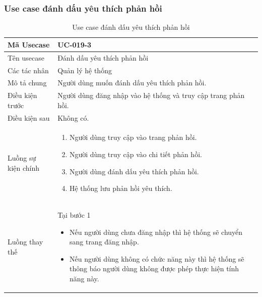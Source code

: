 \documentclass[12pt,a4paper]{article}
\begin{document}
    \subsubsection*{Use case đánh dấu yêu thích phản hồi}
    \begin{table}[H]
        \centering
        \begin{tabular}{|p{3.5cm}|p{11.5cm}|c|}
            \hline
            Mã Usecase      & UC-019-3                                                      \\
            \hline
            Tên usecase     & Đánh dấu yêu thích phản hồi                                   \\
            \hline
            Các tác nhân    & Quản lý hệ thống                                              \\
            \hline
            Mô tả chung     & Người dùng muốn đánh dấu yêu thích phản hồi.                  \\
            \hline

            Điều kiện trước & Người dùng đăng nhập vào hệ thống và truy cập trang phản hồi. \\
            \hline

            Điều kiện sau   & Không có.                                                     \\
            \hline

            Luồng sự kiện chính & \vspace{-.8cm}\begin{enumerate}
                                                    \item Người dùng truy cập vào trang phản hồi.
                                                    \item Người dùng truy cập vào chi tiết phản hồi.
                                                    \item Người dùng đánh dấu yêu thích phản hồi.
                                                    \item Hệ thống lưu phản hồi yêu thích.
            \end{enumerate}
            \\
            \hline
            Luồng thay thế & Tại bước 1\newline
            \vspace{-.8cm}\begin{itemize}
                              \item Nếu người dùng chưa đăng nhập thì hệ thống sẽ chuyển sang trang đăng nhập.
                              \item Nếu người dùng không có chức năng này thì hệ thống sẽ thông báo người dùng không được phép thực hiện tính năng này.
            \end{itemize}
            \\ \hline
        \end{tabular}
        \caption{Use case đánh dấu yêu thích phản hồi}

    \end{table}
\end{document}
